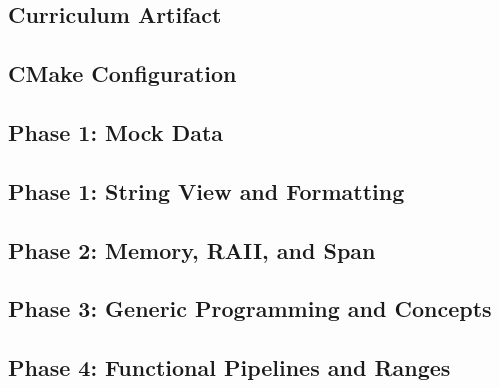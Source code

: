 \documentclass[11pt,a4paper]{article}
\begin{document}
\subsection{Curriculum Artifact}


\subsection{CMake Configuration}


\subsection{Phase 1: Mock Data}


\subsection{Phase 1: String View and Formatting}





\subsection{Phase 2: Memory, RAII, and Span}



\subsection{Phase 3: Generic Programming and Concepts}



\subsection{Phase 4: Functional Pipelines and Ranges}

\end{document}
